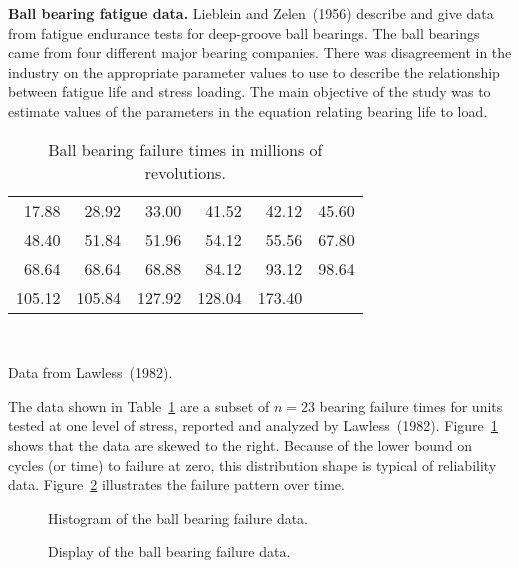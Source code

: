 \begin{example}
\label{example:ball.bearing.data}
{\bf Ball bearing fatigue data.}
Lieblein and Zelen~(1956) describe and give data from 
fatigue endurance tests for deep-groove ball bearings.
The ball bearings came from four
different major bearing companies. There was
disagreement in the industry on the appropriate parameter
values to use to describe the relationship between fatigue life and
stress loading. The main objective of the study was to
estimate values of the parameters in the equation relating 
bearing life to load. 


\begin{table}
\caption{Ball bearing failure times in millions of revolutions.}
\centering\small
\begin{tabular}{*{6}{r}}
\\[-.5ex]
\hline
     17.88 &      
     28.92  &       
     33.00  &       
     41.52  &       
     42.12  &       
     45.60 \\      
     48.40   &      
     51.84  &       
     51.96  &       
     54.12   &      
     55.56  &       
     67.80  \\     
     68.64  &       
     68.64  &       
     68.88   &      
     84.12  &       
     93.12  &       
     98.64  \\     
    105.12   &      
    105.84  &       
    127.92  &       
    128.04   &      
    173.40  \\
\hline      
\end{tabular}\\
\begin{minipage}[t]{4in}
Data from Lawless~(1982).
\end{minipage}
\label{table:lz.bbearing.data}
\end{table}
The data shown in Table~\ref{table:lz.bbearing.data} are a subset of
$n=23$ bearing failure times for units tested at one level of stress,
reported and analyzed by Lawless~(1982).
Figure~\ref{figure:lzbearing.histogram.ps} shows that the data are
skewed to the right. Because of the lower bound on cycles (or time) to
failure at zero, this distribution shape is typical of reliability data.
Figure~\ref{figure:lzbearing.censoringfig.ps} illustrates the failure
pattern over time.
\begin{figure}
\caption{Histogram of the ball bearing failure data.}
\label{figure:lzbearing.histogram.ps}
\end{figure}
\begin{figure}
\caption{Display of the ball bearing failure data.}
\label{figure:lzbearing.censoringfig.ps}
\end{figure}
\end{example}

